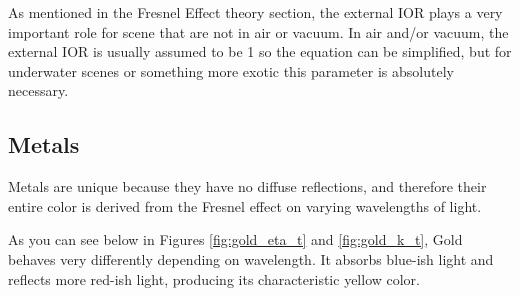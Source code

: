 \documentclass[12pt,letterpaper]{article}
\begin{document}
As mentioned in the Fresnel Effect theory section, the external IOR plays a very important role for scene that are not in air or vacuum. In air and/or vacuum, 
the external IOR is usually assumed to be 1 so the equation can be simplified, but for underwater scenes or something more exotic this parameter is absolutely necessary.

\newpage

\subsection{Metals}

Metals are unique because they have no diffuse reflections, 
and therefore their entire color is derived from the Fresnel effect on varying wavelengths of light.

As you can see below in Figures \ref{fig:gold_eta_t} and \ref{fig:gold_k_t}, 
Gold behaves very differently depending on wavelength. It absorbs blue-ish light and reflects more red-ish light, producing
its characteristic yellow color.
\end{document}
